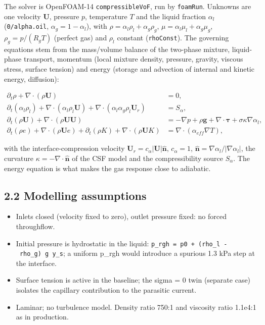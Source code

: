 \documentclass[11pt,english]{article}
\providecommand{\tightlist}{%
  \setlength{\itemsep}{0pt}\setlength{\parskip}{0pt}}
\begin{document}
The solver is OpenFOAM-14 \texttt{compressibleVoF}, run by
\texttt{foamRun}. Unknowns are one velocity \(\mathbf U\), pressure
\(p\), temperature \(T\) and the liquid fraction \(\alpha_l\)
(\texttt{0/alpha.oil}, \(\alpha_g=1-\alpha_l\)), with
\(\rho=\alpha_l\rho_l+\alpha_g\rho_g\),
\(\mu=\alpha_l\mu_l+\alpha_g\mu_g\), \(\rho_g=p/(R_gT)\) (perfect gas)
and \(\rho_l\) constant (\texttt{rhoConst}). The governing equations stem
from the mass/volume balance of the two-phase mixture, liquid-phase
transport, momentum (local mixture density, pressure, gravity, viscous
stress, surface tension) and energy (storage and advection of internal
and kinetic energy, diffusion):

\[
\begin{aligned}
\partial_t \rho + \nabla\cdot(\rho\mathbf U) &= 0,\\
\partial_t(\alpha_l\rho_l)+\nabla\cdot(\alpha_l\rho_l\mathbf U)
+\nabla\cdot(\alpha_l\alpha_g\rho_l\mathbf U_r) &= S_\alpha,\\
\partial_t(\rho\mathbf U)+\nabla\cdot(\rho\mathbf U\mathbf U)
&= -\nabla p+\rho\mathbf g+\nabla\cdot\boldsymbol\tau+\sigma\kappa\nabla\alpha_l,\\
\partial_t(\rho e)+\nabla\cdot(\rho\mathbf U e)+\partial_t(\rho K)+\nabla\cdot(\rho\mathbf U K)
&= \nabla\cdot(\alpha_{eff}\nabla T),
\end{aligned}
\]

with the interface-compression velocity
\(\mathbf U_r=c_\alpha|\mathbf U|\hat{\mathbf n}\), \(c_\alpha=1\),
\(\hat{\mathbf n}=\nabla\alpha_l/|\nabla\alpha_l|\), the curvature
\(\kappa=-\nabla\cdot\hat{\mathbf n}\) of the CSF model and the
compressibility source \(S_\alpha\). The energy equation is what makes
the gas response close to adiabatic.

\subsection{2.2 Modelling assumptions}\label{modelling-assumptions}

\begin{itemize}
\tightlist
\item
  Inlets closed (velocity fixed to zero), outlet pressure fixed: no
  forced throughflow.
\item
  Initial pressure is hydrostatic in the liquid:
  \texttt{p\_rgh\ =\ p0\ +\ (rho\_l\ -\ rho\_g)\ g\ y\_s}; a uniform
  p\_rgh would introduce a spurious 1.3 kPa step at the interface.
\item
  Surface tension is active in the baseline; the sigma = 0 twin
  (separate case) isolates the capillary contribution to the parasitic
  current.
\item
  Laminar; no turbulence model. Density ratio 750:1 and viscosity ratio
  1.1e4:1 as in production.
\end{itemize}
\end{document}
